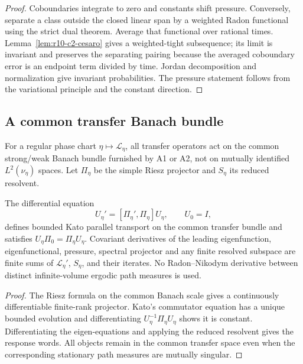 \begin{proof}
Coboundaries integrate to zero and constants shift pressure.  Conversely,
separate a class outside the closed linear span by a weighted Radon functional
using the strict dual theorem.  Average that functional over rational times.
Lemma~\ref{lem:r10-c2-cesaro} gives a weighted-tight subsequence; its limit is
invariant and preserves the separating pairing because the averaged
coboundary error is an endpoint term divided by time.  Jordan decomposition
and normalization give invariant probabilities.  The pressure statement
follows from the variational principle and the constant direction.
\end{proof}

\subsection{A common transfer Banach bundle}

For a regular phase chart \(\eta\mapsto\mathcal L_\eta\), all transfer
operators act on the common strong/weak Banach bundle furnished by A1 or A2,
not on mutually identified \(L^2(\nu_\eta)\) spaces.  Let \(\Pi_\eta\) be the
simple Riesz projector and \(S_\eta\) its reduced resolvent.

\begin{theorem}
\label{thm:r10-c2-kato}
The differential equation
\[
 U_\eta'=[\Pi_\eta',\Pi_\eta]U_\eta,
 \qquad U_0=I,
\]
defines bounded Kato parallel transport on the common transfer bundle and
satisfies \(U_\eta\Pi_0=\Pi_\eta U_\eta\).  Covariant derivatives of the
leading eigenfunction, eigenfunctional, pressure, spectral projector and any
finite resolved subspace are finite sums of \(\mathcal L_\eta'\),
\(S_\eta\), and their iterates.  No Radon--Nikodym derivative between distinct
infinite-volume ergodic path measures is used.
\end{theorem}

\begin{proof}
The Riesz formula on the common Banach scale gives a continuously
differentiable finite-rank projector.  Kato's commutator equation has a unique
bounded evolution and differentiating
\(U_\eta^{-1}\Pi_\eta U_\eta\) shows it is constant.  Differentiating the
eigen-equations and applying the reduced resolvent gives the response words.
All objects remain in the common transfer space even when the corresponding
stationary path measures are mutually singular.
\end{proof}

